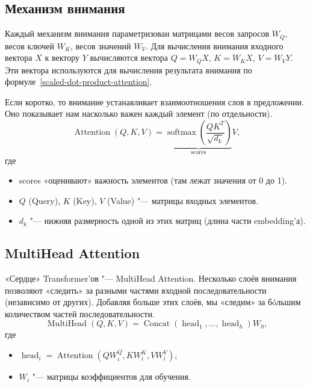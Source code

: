 \subsection{Механизм внимания}


Каждый механизм внимания параметризован матрицами весов запросов $W_{Q}$, весов ключей $W_{K}$, весов значений $W_{V}$. Для вычисления внимания входного вектора $X$ к вектору $Y$ вычисляются вектора $Q=W_{Q}X$, $K=W_{K}X$, $V=W_{V}Y$. Эти вектора используются для вычисления результата внимания по формуле~\eqref{scaled-dot-product-attention}.

Если коротко, то внимание устанавливает взаимоотношения слов в предложении. Оно показывает нам насколько важен каждый элемент (по отдельности).
\begin{equation}\label{scaled-dot-product-attention}%
  \operatorname{Attention}(Q, K, V) = \underbrace{
    \operatorname{softmax}\left(
      \frac{QK^T}{\sqrt{d_k}}
    \right)
  }_{\text{scores}}
  V,
\end{equation}
где
\begin{itemize}%
  \item scores «оценивают» важность элементов (там лежат значения от 0 до 1).
  \item $Q$ (Query), $K$ (Key), $V$ (Value) "--- матрицы входных элементов.
  \item $d_k$ "--- нижняя размерность одной из этих матриц (длина части embedding'а).
\end{itemize}


\subsection{MultiHead Attention}


«Сердце» Transformer'ов "--- MultiHead Attention.
Несколько слоёв внимания позволяют «следить» за разными частями входной последовательности (независимо от других).
Добавляя больше этих слоёв, мы «следим» за бóльшим количеством частей последовательности.
\begin{equation}\label{multihead-attention-mechanism}%
  \operatorname{MultiHead}(Q, K, V) = \operatorname{Concat}\left(\operatorname{head}_1, \ldots, \operatorname{head}_h \right) W_0,
\end{equation}
где
\begin{itemize}%
  \item $\operatorname{head}_i = \operatorname{Attention}(QW_i^Q, KW_i^K, VW_i^V) $,
  \item $W_i$ "--- матрицы коэффициентов для обучения.
\end{itemize}


